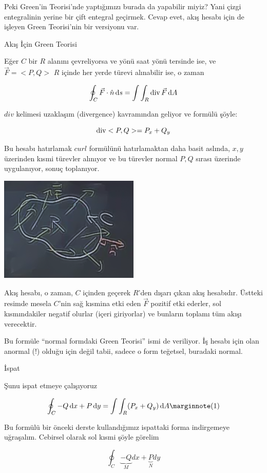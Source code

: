 \documentclass[12pt,fleqn]{article}\usepackage{../../common}
\begin{document}
Peki Green'in Teorisi'nde yaptığımızı burada da yapabilir miyiz? Yani çizgi
entegralinin yerine bir çift entegral geçirmek. Cevap evet, akış hesabı için de
işleyen Green Teorisi'nin bir versiyonu var.

Akış İçin Green Teorisi

Eğer $C$ bir $R$ alanını çevreliyorsa ve yönü saat yönü tersinde ise, ve
$\vec{F}=< P,Q >$ $R$ içinde her yerde türevi alınabilir ise, o zaman 

$$ \oint_C \vec{F} \cdot \hat{n} \,\mathrm{d} s = 
\int \int_R \operatorname{div} \vec{F} \,\mathrm{d} A
$$

$div$ kelimesi uzaklaşım (divergence) kavramından geliyor ve formülü şöyle:

$$ \operatorname{div} < P,Q > = P_x + Q_y $$

Bu hesabı hatırlamak $curl$ formülünü hatırlamaktan daha basit aslında,
$x,y$ üzerinden kısmi türevler alınıyor ve bu türevler normal $P,Q$ sırası
üzerinde uygulanıyor, sonuç toplanıyor. 

\includegraphics[height=5cm]{23_8.png}

Akış hesabı, o zaman, $C$ içinden geçerek $R$'den dışarı çıkan akış
hesabıdır. Üstteki resimde mesela $C$'nin sağ kısmina etki eden $\vec{F}$
pozitif etki ederler, sol kısmındakiler negatif olurlar (içeri giriyorlar)
ve bunların toplamı tüm akışı verecektir. 

Bu formüle ``normal formdaki Green Teorisi'' ismi de veriliyor. İş hesabı
için olan anormal (!) olduğu için değil tabii, sadece o form teğetsel,
buradaki normal. 

İspat

Şunu ispat etmeye çalışıyoruz

$$
\oint_C -Q \ud x + P \ud y = \int \int_R (P_x + Q_y) \ud A 
\mlabel{1}
$$

Bu formülü bir önceki derste kullandığımız ispattaki forma indirgemeye
uğraşalım. Cebirsel olarak sol kısmi şöyle görelim

$$ \oint_C 
\underbrace{-Q}_{M}dx + 
\underbrace{P}_{N}dy 
$$
\end{document}
